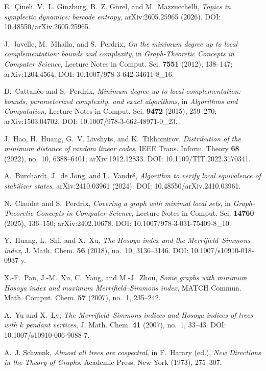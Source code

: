  E.~\c{C}ineli, V.~L. Ginzburg, B.~Z. G\"urel,
and M.~Mazzucchelli, \emph{Topics in symplectic dynamics: barcode entropy},
arXiv:2605.25965 (2026). DOI: 10.48550/arXiv.2605.25965.

 J.~Javelle, M.~Mhalla, and S.~Perdrix,
\emph{On the minimum degree up to local complementation: bounds and
complexity}, in \emph{Graph-Theoretic Concepts in Computer Science},
Lecture Notes in Comput. Sci. \textbf{7551} (2012), 138--147;
arXiv:1204.4564. DOI: 10.1007/978-3-642-34611-8\_16.

 D.~Cattan\'eo and S.~Perdrix,
\emph{Minimum degree up to local complementation: bounds, parameterized
complexity, and exact algorithms}, in \emph{Algorithms and Computation},
Lecture Notes in Comput. Sci. \textbf{9472} (2015), 259--270;
arXiv:1503.04702. DOI: 10.1007/978-3-662-48971-0\_23.

 J.~Hao, H.~Huang, G.~V. Livshyts, and
K.~Tikhomirov,
\emph{Distribution of the minimum distance of random linear codes},
IEEE Trans. Inform. Theory \textbf{68} (2022), no.~10, 6388--6401;
arXiv:1912.12833. DOI: 10.1109/TIT.2022.3170341.

 A.~Burchardt, J.~de Jong, and L.~Vandr\'e,
\emph{Algorithm to verify local equivalence of stabilizer states},
arXiv:2410.03961 (2024). DOI: 10.48550/arXiv.2410.03961.

 N.~Claudet and S.~Perdrix,
\emph{Covering a graph with minimal local sets}, in \emph{Graph-Theoretic
Concepts in Computer Science}, Lecture Notes in Comput. Sci. \textbf{14760}
(2025), 136--150; arXiv:2402.10678.
DOI: 10.1007/978-3-031-75409-8\_10.

 Y.~Huang, L.~Shi, and X.~Xu,
\emph{The Hosoya index and the Merrifield--Simmons index},
J. Math. Chem. \textbf{56} (2018), no.~10, 3136--3146.
DOI: 10.1007/s10910-018-0937-y.

 X.-F.~Pan, J.-M.~Xu, C.~Yang, and M.-J.~Zhou,
\emph{Some graphs with minimum Hosoya index and maximum
Merrifield--Simmons index}, MATCH Commun. Math. Comput. Chem. \textbf{57}
(2007), no.~1, 235--242.

 A.~Yu and X.~Lv,
\emph{The Merrifield--Simmons indices and Hosoya indices of trees with
$k$ pendant vertices}, J. Math. Chem. \textbf{41} (2007), no.~1, 33--43.
DOI: 10.1007/s10910-006-9088-7.

 A.~J. Schwenk, \emph{Almost all trees are cospectral},
in F.~Harary (ed.), \emph{New Directions in the Theory of Graphs},
Academic Press, New York (1973), 275--307.

